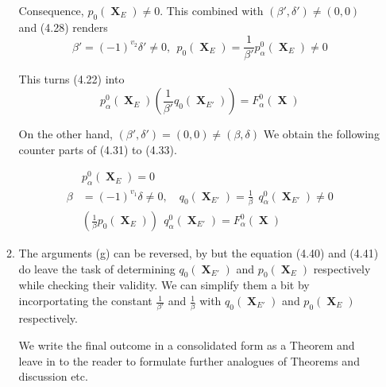 \documentclass[a4paper,12pt]{article}
\DeclareMathOperator{\x}{\mathrm{X}}
\theoremstyle{definition}
\theoremstyle{underlinethm}
\theoremstyle{definition}
\begin{document}
\begin{enumerate}[label=(\alph*)]
\begin{enumerate}[label=(\alph*)]
Consequence, $p_{0}(\boldsymbol{\x}_{E}) \neq  0$. This combined with $(\beta', \delta') \neq (0,0)$ and (4.28) renders 
\begin{equation}
\beta'=(-1)^{v_{2}} \delta' \neq 0, ~~p_{0}(\boldsymbol{\x}_{E}) = \frac{1}{\beta'} p_{\alpha}^{0}(\boldsymbol{\x}_{E}) \neq 0\tag{4.39}\label{eq-4.39}
\end{equation} 

This turns (4.22) into
\begin{equation}
p_{\alpha}^{0} (\boldsymbol{\x}_{E}) \left(\frac{1}{\beta'} q_{0} (\boldsymbol{\x}_{E'}) \right) = F_{\alpha}^{0}(\boldsymbol{\x})\tag{4.40}\label{eq-4.40}
\end{equation}

On the other hand, $(\beta', \delta') = (0,0) \neq (\beta, \delta)$ We obtain the following counter parts of (4.31) to (4.33).

\begin{align*}
&p_{\alpha}^{0} (\boldsymbol{\x}_{E}) = 0\tag{4.41}\label{eq-4.41}\\
\beta &= (-1)^{v_{1}} \delta \neq 0, \quad q_{0}(\boldsymbol{\x}_{E'}) = \frac{1}{\beta} ~~q_{\alpha}^{0} (\boldsymbol{\x}_{E'}) \neq 0\tag{4.42}\label{eq-4.42}\\
&\left(\frac{1}{\beta} p_{0}(\boldsymbol{\x}_{E}) \right)~~q_{\alpha}^{0} (\boldsymbol{\x}_{E'}) = F_{\alpha}^{0}(\boldsymbol{\x})\tag{4.43}\label{eq-4.43}
\end{align*} 

\item The arguments (g) can be reversed, by but the equation (4.40) and (4.41) do leave the task of determining $q_{0}(\boldsymbol{\x}_{E'})$ and $p_{0}(\boldsymbol{\x}_{E})$  respectively while checking their validity. We can simplify them a bit by incorportating the constant $\frac{1}{\beta'}$ and $\frac{1}{\beta}$ with $q_{0}(\boldsymbol{\x}_{E'})$ and $p_{0}(\boldsymbol{\x}_{E})$ respectively.

We write the final outcome in a consolidated form as a Theorem and leave in to the reader to formulate further analogues of Theorems and discussion etc.
\end{enumerate}
\end{enumerate}
\end{document}
